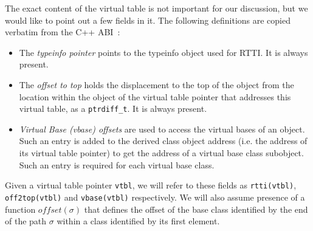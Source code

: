 \documentclass[preprint]{sigplanconf}
\makeatletter
\DeclareRobustCommand{\code}[1]{{\lstinline[breaklines=false,escapechar=@]{#1}}}
\makeatother
\begin{document}

The exact content of the virtual table is not important for our discussion, but 
we would like to point out a few fields in it. The following definitions are 
copied verbatim from the C++ ABI~\cite[.2]{C++ABI}:

\begin{itemize}
\setlength{\itemsep}{0pt}
\setlength{\parskip}{0pt}
\item The \emph{typeinfo pointer} points to the typeinfo object used for RTTI. 
      It is always present.  
\item The \emph{offset to top} holds the displacement to the top of the object 
      from the location within the object of the virtual table pointer that 
      addresses this virtual table, as a \code{ptrdiff_t}. It is always present.
\item \emph{Virtual Base (vbase) offsets} are used to access the virtual bases 
      of an object. Such an entry is added to the derived class object address 
      (i.e. the address of its virtual table pointer) to get the address of a 
      virtual base class subobject. Such an entry is required for each virtual 
      base class.
\end{itemize}

\noindent
Given a virtual table pointer \code{vtbl}, we will refer to these fields as 
\code{rtti(vtbl)}, \code{off2top(vtbl)} and \code{vbase(vtbl)} respectively. 
We will also assume presence of a function $\mathit{offset}(\sigma)$ that defines the 
offset of the base class identified by the end of the path $\sigma$ within a 
class identified by its first element.
\end{document}
